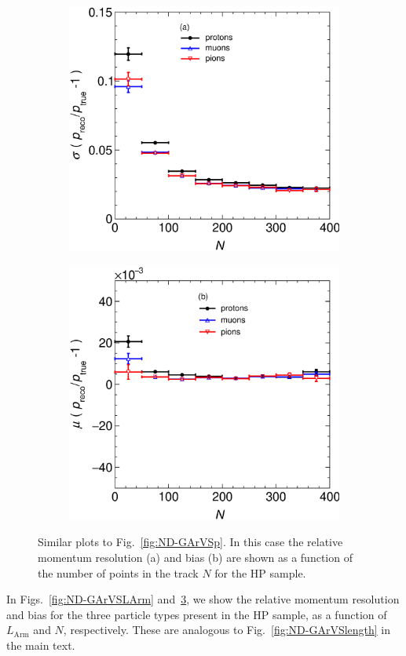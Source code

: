 \begin{figure}[t]
     \centering
     \begin{subfigure}[b]{0.37\textwidth}
         \centering
         \includegraphics[width=\textwidth]{figures/Appendix/RespVSNPoints_XL.eps}
         \caption{}
         \label{fig:ResND-GArVSNPoints}
     \end{subfigure}
     \begin{subfigure}[b]{0.37\textwidth}
         \centering
         \includegraphics[width=\textwidth]{figures/Appendix/BiaspVSNPoints_XL.eps}
         \caption{}
         \label{fig:BiasND-GArVSNPoints}
     \end{subfigure}
        \caption{Similar plots to Fig.~\ref{fig:ND-GArVSp}. In this case the relative momentum resolution (a) and bias (b) are shown as a function of the number of points in the track $N$ for the HP sample.}
        \label{fig:ND-GArVSNPoints}
\end{figure}

In Figs.~\ref{fig:ND-GArVSLArm} and~\ref{fig:ND-GArVSNPoints}, we show the relative momentum resolution and bias for the three particle types present in the HP sample, as a function of $L_\textrm{Arm}$ and $N$, respectively. These are analogous to Fig.~\ref{fig:ND-GArVSlength} in the main text.


